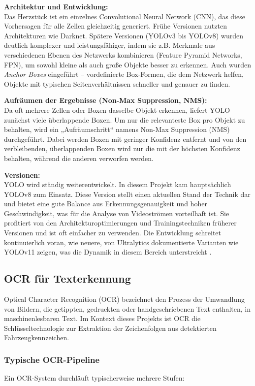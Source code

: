 \textbf{Architektur und Entwicklung:} \\
Das Herzstück ist ein einzelnes Convolutional Neural Network (CNN), das diese Vorhersagen für alle Zellen gleichzeitig generiert. Frühe Versionen nutzten Architekturen wie Darknet. Spätere Versionen (YOLOv3 bis YOLOv8) wurden deutlich komplexer und leistungsfähiger, indem sie z.B. Merkmale aus verschiedenen Ebenen des Netzwerks kombinieren (Feature Pyramid Networks, FPN), um sowohl kleine als auch große Objekte besser zu erkennen. Auch wurden \textit{Anchor Boxes} eingeführt – vordefinierte Box-Formen, die dem Netzwerk helfen, Objekte mit typischen Seitenverhältnissen schneller und genauer zu finden.

\textbf{Aufräumen der Ergebnisse (Non-Max Suppression, NMS):} \\
Da oft mehrere Zellen oder Boxen dasselbe Objekt erkennen, liefert YOLO zunächst viele überlappende Boxen. Um nur die relevanteste Box pro Objekt zu behalten, wird ein „Aufräumschritt“ namens Non-Max Suppression (NMS) durchgeführt. Dabei werden Boxen mit geringer Konfidenz entfernt und von den verbleibenden, überlappenden Boxen wird nur die mit der höchsten Konfidenz behalten, während die anderen verworfen werden.

\textbf{Versionen:} \\
YOLO wird ständig weiterentwickelt. In diesem Projekt kam hauptsächlich YOLOv8 zum Einsatz. Diese Version stellt einen aktuellen Stand der Technik dar und bietet eine gute Balance aus Erkennungsgenauigkeit und hoher Geschwindigkeit, was für die Analyse von Videoströmen vorteilhaft ist. Sie profitiert von den Architekturoptimierungen und Trainingstechniken früherer Versionen und ist oft einfacher zu verwenden. Die Entwicklung schreitet kontinuierlich voran, wie neuere, von Ultralytics dokumentierte Varianten wie YOLOv11 zeigen, was die Dynamik in diesem Bereich unterstreicht \cite{ultralytics_cv_2025}.

\subsection{OCR für Texterkennung}

Optical Character Recognition (OCR) bezeichnet den Prozess der Umwandlung von Bildern, die getippten, gedruckten oder handgeschriebenen Text enthalten, in maschinenlesbaren Text. Im Kontext dieses Projekts ist OCR die Schlüsseltechnologie zur Extraktion der Zeichenfolgen aus detektierten Fahrzeugkennzeichen.

\subsubsection{Typische OCR-Pipeline}
Ein OCR-System durchläuft typischerweise mehrere Stufen: \cite{tesseract}

